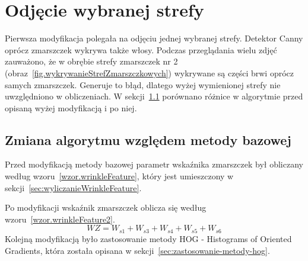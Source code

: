 \documentclass[a4paper,twoside,12pt]{book}
\begin{document}
    \section{Odjęcie wybranej strefy}\label{sec:odjęcie-wybranej-strefy}
    Pierwsza modyfikacja polegała na odjęciu jednej wybranej strefy. Detektor Canny oprócz zmarszczek
    wykrywa także włosy. Podczas przeglądania wielu zdjęć zauważono, że w obrębie
    strefy zmarszczek nr 2 (obraz~\ref{fig.wykrywanieStrefZmarszczkowych}) wykrywane są części brwi oprócz samych
    zmarszczek. Generuje to błąd, dlatego wyżej wymienionej strefy nie uwzględniono w obliczeniach.
    W sekcji~\ref{subsec:zmiana-algorytmu-względem-metody-bazowej} porównano różnice w algorytmie przed opisaną wyżej
    modyfikacją i po niej.

    \subsection{Zmiana algorytmu względem metody bazowej}\label{subsec:zmiana-algorytmu-względem-metody-bazowej}
    Przed modyfikacją metody bazowej parametr wskaźnika zmarszczek był obliczany według wzoru~\ref{wzor.wrinkleFeature},
    który jest umieszczony w sekcji~\ref{sec:wyliczanieWrinkleFeature}.

    Po modyfikacji wskaźnik zmarszczek oblicza się według wzoru~\ref{wzor.wrinkleFeature2}.
    \large
    \begin{equation}
        WZ = W_{s1} + W_{s3} + W_{s4} + W_{s5} + W_{s6}
        \label{wzor.wrinkleFeature2}
    \end{equation}
    \normalsize
    Kolejną modyfikacją było zastosowanie metody HOG - Histograms of Oriented Gradients, która została opisana w
    sekcji~\ref{sec:zastosowanie-metody-hog}.
\end{document}
